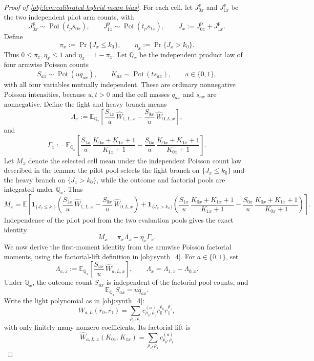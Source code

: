 \begin{proof}[Proof of \cref{obj:lem:calibrated-hybrid-mean-bias}]
For each cell, let \(J_{0x}^{\mathrm p}\) and \(J_{1x}^{\mathrm p}\) be the two independent pilot arm counts, with
\[
J_{0x}^{\mathrm p}\sim\operatorname{Poi}(t_p s_{0x}),
\qquad
J_{1x}^{\mathrm p}\sim\operatorname{Poi}(t_p s_{1x}),
\qquad
J_x:=J_{0x}^{\mathrm p}+J_{1x}^{\mathrm p}.
\]
Define
\[
\pi_x
:=
\Pr\{J_x\le k_0\},
\qquad
\eta_x
:=
\Pr\{J_x>k_0\}.
\]
Thus \(0\le\pi_x,\eta_x\le1\) and \(\eta_x=1-\pi_x\).  Let \(\mathbb Q_x\) be the independent product law of four armwise Poisson counts
\[
S_{ax}\sim\operatorname{Poi}(u q_{ax}),
\qquad
K_{ax}\sim\operatorname{Poi}(t s_{ax}),
\qquad a\in\{0,1\},
\]
with all four variables mutually independent.  These are ordinary nonnegative Poisson intensities, because \(u,t>0\) and the cell masses \(q_{ax}\) and \(s_{ax}\) are nonnegative.  Define the light and heavy branch means
\[
\Lambda_x
:=
\mathbb E_{\mathbb Q_x}\!\left[
\frac{S_{1x}}u\,\widehat W_{1,L,x}
-
\frac{S_{0x}}u\,\widehat W_{0,L,x}
\right],
\]
and
\[
\Gamma_x
:=
\mathbb E_{\mathbb Q_x}\!\left[
\frac{S_{1x}}u\,\frac{K_{0x}+K_{1x}+1}{K_{1x}+1}
-
\frac{S_{0x}}u\,\frac{K_{0x}+K_{1x}+1}{K_{0x}+1}
\right].
\]
Let \(M_x\) denote the selected cell mean under the independent Poisson count law described in the lemma: the pilot pool selects the light branch on \(\{J_x\le k_0\}\) and the heavy branch on \(\{J_x>k_0\}\), while the outcome and factorial pools are integrated under \(\mathbb Q_x\).  Thus
\[
M_x
=
\mathbb E\!\left[
\mathbf 1_{\{J_x\le k_0\}}\left(
\frac{S_{1x}}u\,\widehat W_{1,L,x}
-
\frac{S_{0x}}u\,\widehat W_{0,L,x}\right)
+
\mathbf 1_{\{J_x>k_0\}}\left(
\frac{S_{1x}}u\,\frac{K_{0x}+K_{1x}+1}{K_{1x}+1}
-
\frac{S_{0x}}u\,\frac{K_{0x}+K_{1x}+1}{K_{0x}+1}\right)
\right].
\]
Independence of the pilot pool from the two evaluation pools gives the exact identity
\[
M_x=\pi_x\Lambda_x+\eta_x\Gamma_x .
\]
We now derive the first-moment identity from the armwise Poisson factorial moments, using the factorial-lift definition in \cref{obj:synth_4}.  For \(a\in\{0,1\}\), set
\[
\Lambda_{a,x}
:=
\mathbb E_{\mathbb Q_x}\!\left[
\frac{S_{ax}}u\,\widehat W_{a,L,x}
\right],
\qquad
\Lambda_x=\Lambda_{1,x}-\Lambda_{0,x}.
\]
Under \(\mathbb Q_x\), the outcome count \(S_{ax}\) is independent of the factorial-pool counts, and
\[
\mathbb E_{\mathbb Q_x}S_{ax}=u q_{ax}.
\]
Write the light polynomial as in \cref{obj:synth_4}:
\[
W_{a,L}(r_0,r_1)=\sum_{\rho_0,\rho_1}
 c^{(a)}_{\rho_0,\rho_1}r_0^{\rho_0}r_1^{\rho_1},
\]
with only finitely many nonzero coefficients.  Its factorial lift is
\[
\widehat W_{a,L,x}(K_{0x},K_{1x})
=
\sum_{\rho_0,\rho_1}c^{(a)}_{\rho_0,\rho_1}
\]
\end{proof}
